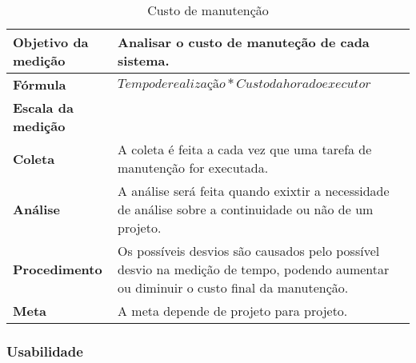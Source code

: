 \begin{table}[H]
\centering
\begin{tabular}{|p{4cm}|p{5cm}|}
\hline
	\textbf{Objetivo da medição} &
	Analisar o custo de manuteção de cada sistema.
	\\ \hline
	\textbf{Fórmula} &
	$Tempo de realização * Custo da hora do executor$
	\\ \hline
	\textbf{Escala da medição} &

	\\ \hline
	\textbf{Coleta} &
	A coleta é feita a cada vez que uma tarefa de manutenção for executada.
	\\ \hline
	\textbf{Análise} &
	A análise será feita quando exixtir a necessidade de análise sobre a continuidade ou não de um projeto.
	\\ \hline
	\textbf{Procedimento} &
	Os possíveis desvios são causados pelo possível desvio na medição de tempo, podendo aumentar ou diminuir o custo final da manutenção.
	\\ \hline
  \textbf{Meta} &
	A meta depende de projeto para projeto.
  \\ \hline
\end{tabular}
\caption{Custo de manutenção}
\label{tab:custo_de_manutenção}
\end{table}

\subsubsection{Usabilidade}

